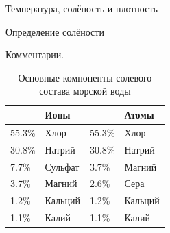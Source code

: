 \begin{chapter}{Температура, солёность и плотность}
\begin{section}{Определение солёности}
\begin{paragraph}{Комментарии.}
\begin{table}\label{tbl:6.1}
\caption{Основные компоненты солевого состава морской воды}
\begin{center}
\begin{tabular}{llll}
\hline
 & Ионы	& & Атомы\\
\hline
55.3\% & Хлор & 55.3\% & Хлор \\
30.8\% & Натрий & 30.8\% & Натрий\\
 7.7\% & Сульфат & 3.7\% & Магний\\
 3.7\% & Магний  & 2.6\% & Сера\\
 1.2\% & Кальций & 1.2\% & Кальций\\
 1.1\% & Калий   & 1.1\% & Калий\\
\hline
\end{tabular}
\end{center}
\end{table}
%
\end{paragraph}


\end{section}
\end{chapter}
